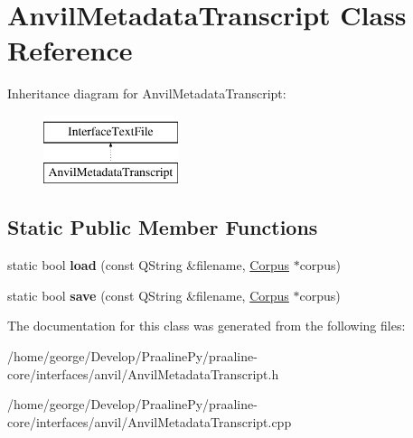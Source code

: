 \hypertarget{class_anvil_metadata_transcript}{}\section{Anvil\+Metadata\+Transcript Class Reference}
\label{class_anvil_metadata_transcript}
Inheritance diagram for Anvil\+Metadata\+Transcript\+:\begin{figure}[H]
\begin{center}
\leavevmode
\includegraphics[height=2.000000cm]{class_anvil_metadata_transcript}
\end{center}
\end{figure}
\subsection*{Static Public Member Functions}
\begin{DoxyCompactItemize}
\item 
\mbox{\label{class_anvil_metadata_transcript_af9df94e4175f6c841a5d96436294315f}} 
static bool {\bfseries load} (const Q\+String \&filename, \hyperlink{class_corpus}{Corpus} $\ast$corpus)
\item 
\mbox{\label{class_anvil_metadata_transcript_ab39806d466bc019d679de3aecad0d831}} 
static bool {\bfseries save} (const Q\+String \&filename, \hyperlink{class_corpus}{Corpus} $\ast$corpus)
\end{DoxyCompactItemize}


The documentation for this class was generated from the following files\+:\begin{DoxyCompactItemize}
\item 
/home/george/\+Develop/\+Praaline\+Py/praaline-\/core/interfaces/anvil/Anvil\+Metadata\+Transcript.\+h\item 
/home/george/\+Develop/\+Praaline\+Py/praaline-\/core/interfaces/anvil/Anvil\+Metadata\+Transcript.\+cpp\end{DoxyCompactItemize}
